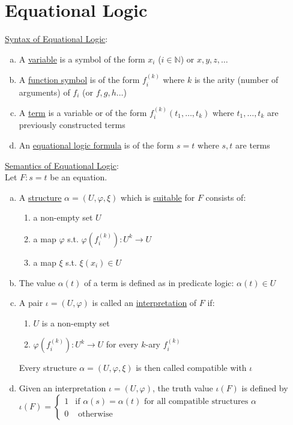 \documentclass[a4paper]{article}
\newcommand{\ul}{\underline}
\let\phi\varphi
\begin{document}
\section{Equational Logic}
\ul{Syntax of Equational Logic}:
\begin{enumerate}[(a)]
	\item A \ul{variable} is a symbol of the form $x_i$ ($i\in\mathbb{N}$) or $x,y,z,\dots$
	\item A \ul{function symbol} is of the form $f_i^{(k)}$ where $k$ is the arity (number of arguments) of $f_i$ (or $f,g,h\dots$)
	\item A \ul{term} is a variable or of the form $f_i^{(k)}(t_1,\dots,t_k)$ where $t_1,\dots,t_k$ are previously constructed terms
	\item An \ul{equational logic formula} is of the form $s=t$ where $s,t$ are terms
\end{enumerate}
\ul{Semantics of Equational Logic}:\\
Let $F:s=t$ be an equation.
\begin{enumerate}[(a)]
	\item A \ul{structure} $\alpha=(U,\phi,\xi)$ which is \ul{suitable} for $F$ consists of:
	\begin{enumerate}[(1)]
		\item a non-empty set $U$
		\item a map $\phi$ s.t. $\phi(f_i^{(k)}):U^k\rightarrow U$
		\item a map $\xi$ s.t. $\xi(x_i)\in U$
	\end{enumerate}
	\item The value $\alpha(t)$ of a term is defined as in predicate logic: $\alpha(t)\in U$
	\item A pair $\iota=(U,\phi)$ is called an \ul{interpretation} of $F$ if:
	\begin{enumerate}[(1)]
		\item $U$ is a non-empty set
		\item $\phi(f_i^{(k)}):U^k\rightarrow U$ for every $k$-ary $f_i^{(k)}$
	\end{enumerate}
	Every structure $\alpha=(U,\phi,\xi)$ is then called compatible with $\iota$
	\item Given an interpretation $\iota=(U,\phi)$, the truth value $\iota(F)$ is defined by $\iota(F)=\begin{cases}
	1 & \text{if }\alpha(s)=\alpha(t)\text{ for all compatible structures }\alpha\\
	0 & \text{ otherwise}
	\end{cases}$
\end{enumerate}
\end{document}
